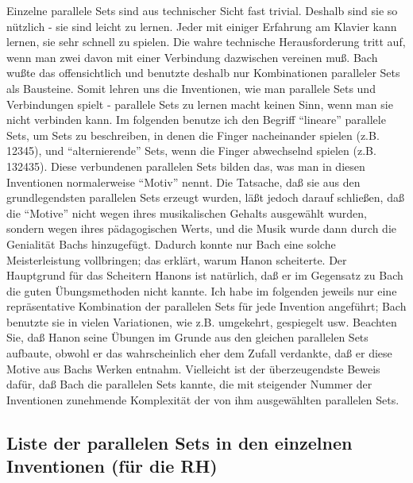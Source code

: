 Einzelne parallele Sets sind aus technischer Sicht fast trivial.
Deshalb sind sie so nützlich - sie sind leicht zu lernen.
Jeder mit einiger Erfahrung am Klavier kann lernen, sie sehr schnell zu spielen.
Die wahre technische Herausforderung tritt auf, wenn man zwei davon mit einer Verbindung dazwischen vereinen muß.
Bach wußte das offensichtlich und benutzte deshalb nur Kombinationen paralleler Sets als Bausteine.
Somit lehren uns die Inventionen, wie man parallele Sets und Verbindungen spielt - parallele Sets zu lernen macht keinen Sinn, wenn man sie nicht verbinden kann.
Im folgenden benutze ich den Begriff \enquote{lineare} parallele Sets, um Sets zu beschreiben, in denen die Finger nacheinander spielen (z.B. 12345), und \enquote{alternierende} Sets, wenn die Finger abwechselnd spielen (z.B. 132435).
Diese verbundenen parallelen Sets bilden das, was man in diesen Inventionen normalerweise \enquote{Motiv} nennt.
Die Tatsache, daß sie aus den grundlegendsten parallelen Sets erzeugt wurden, läßt jedoch darauf schließen, daß die \enquote{Motive} nicht wegen ihres musikalischen Gehalts ausgewählt wurden, sondern wegen ihres pädagogischen Werts, und die Musik wurde dann durch die Genialität Bachs hinzugefügt.
Dadurch konnte nur Bach eine solche Meisterleistung vollbringen; das erklärt, warum Hanon scheiterte.
Der Hauptgrund für das Scheitern Hanons ist natürlich, daß er im Gegensatz zu Bach die guten Übungsmethoden nicht kannte.
Ich habe im folgenden jeweils nur eine repräsentative Kombination der parallelen Sets für jede Invention angeführt; Bach benutzte sie in vielen Variationen, wie z.B. umgekehrt, gespiegelt usw.
Beachten Sie, daß Hanon seine Übungen im Grunde aus den gleichen parallelen Sets aufbaute, obwohl er das wahrscheinlich eher dem Zufall verdankte, daß er diese Motive aus Bachs Werken entnahm.
Vielleicht ist der überzeugendste Beweis dafür, daß Bach die parallelen Sets kannte, die mit steigender Nummer der Inventionen zunehmende Komplexität der von ihm ausgewählten parallelen Sets.


\subsection{Liste der parallelen Sets in den einzelnen Inventionen (für die RH)}
\label{c1iii20ps}

